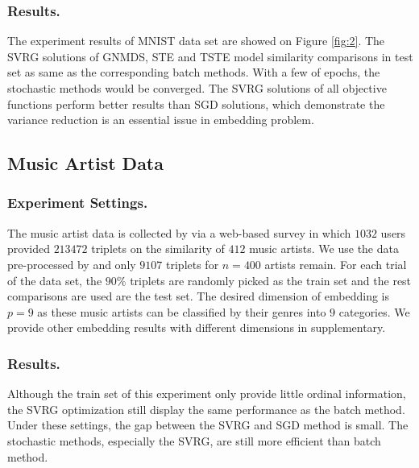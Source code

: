 \documentclass[letterpaper]{article}
\newcommand{\qqxu}[1]{\textcolor[rgb]{0.00,1.00,0.00}{#1}}
\begin{document}
		\subsubsection{Results.}

		The experiment results of MNIST data set are showed on Figure \ref{fig:2}. The SVRG solutions of GNMDS, STE and TSTE model similarity comparisons in test set as same as the corresponding batch methods. With a few of epochs, the stochastic methods would be converged. The SVRG solutions of all objective functions perform better results than SGD solutions, which demonstrate the variance reduction is an essential issue in embedding problem.

		\subsection{Music Artist Data}

		\subsubsection{Experiment Settings.}

		The music artist data is collected by \cite{ellis2002quest} via a web-based survey in which $1032$ users provided $213472$ triplets on the similarity of $412$ music artists. We use the data pre-processed by \cite{vandermaaten2012stochastic} and only $9107$ triplets for $n=400$ artists remain. For each trial of the data set, the $90\%$ triplets are randomly picked as the train set and the rest comparisons are used are the test set. The desired dimension of embedding is $p = 9$ as these music artists can be classified by their genres into $9$ categories. We provide other embedding results with different dimensions in supplementary.

		\subsubsection{Results.}
		
		Although the train set of this experiment only provide little ordinal information, the SVRG optimization still display the same performance as the batch method. Under these settings, the gap between the SVRG and SGD method is small. The stochastic methods, especially the SVRG, are still more efficient than batch method.

\end{document}
